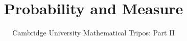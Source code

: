 \documentclass{article}
\title{Probability and Measure}
\author{Cambridge University Mathematical Tripos: Part II}
\begin{document}
\maketitle

\tableofcontentsnewpage{}

%
\end{document}
